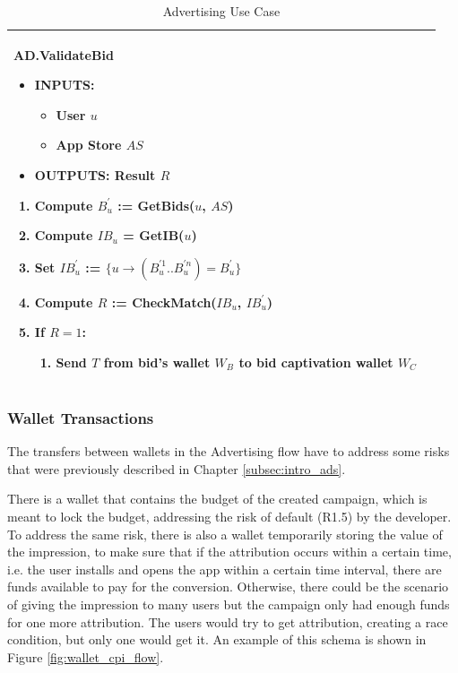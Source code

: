 \begin{table}[H]
\begin{tabular}{|p{}p{}|}
\textsf{AD.ValidateBid}
\begin{itemize}
	\vspace{-0.3cm}
	\item INPUTS:
	\vspace{-0.4cm}
	\begin{itemize}
		\item User $u$
		\item App Store $AS$
	\end{itemize}
	\item OUTPUTS: Result $R$
\end{itemize}
\begin{enumerate}
	\item Compute $B^{'}_{u}$ := \textsf{GetBids}($u$, $AS$)
	\item Compute $IB_u$ = \textsf{GetIB}($u$)
	\item Set $IB^{'}_{u}$ := $\{u \to (B^{'1}_{u}..B^{'n}_{u}) = B^{'}_{u}\}$
	\item Compute $R$ := \textsf{CheckMatch}($IB_u$, $IB^{'}_{u}$)
	\item If $R = 1$:
	\begin{enumerate}
		\item Send $T$ from bid's wallet $W_B$ to bid captivation wallet $W_C$
	\end{enumerate}
\end{enumerate} & \\
\hline
\end{tabular}
\caption{Advertising Use Case}
\label{table: ads_use_case}
\end{table}


\subsubsection{Wallet Transactions}

The transfers between wallets in the Advertising flow have to address some risks that were previously described in Chapter \ref{subsec:intro_ads}.

There is a wallet that contains the budget of the created campaign, which is meant to lock the budget, addressing the risk of default (R1.5) by the developer. To address the same risk, there is also a wallet temporarily storing the value of the impression, to make sure that if the attribution occurs within a certain time, i.e. the user installs and opens the app within a certain time interval, there are funds available to pay for the conversion. Otherwise, there could be the scenario of giving the impression to many users but the campaign only had enough funds for one more attribution. The users would try to get attribution, creating a race condition, but only one would get it. An example of this schema is shown in Figure \ref{fig:wallet_cpi_flow}.

